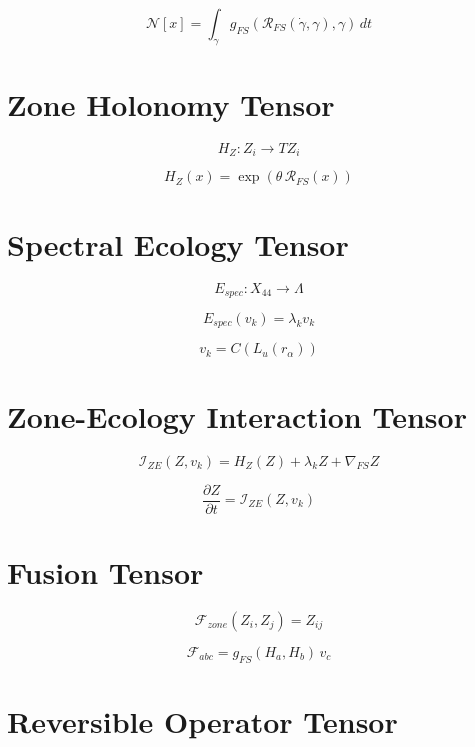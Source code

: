\[
\mathcal{N}[x]
= \int_{\gamma}
g_{FS}(\mathcal{R}_{FS}(\dot{\gamma},\gamma), \gamma)\, dt
\]


\section*{Zone Holonomy Tensor}

\[
H_Z : Z_i \to TZ_i
\]

\[
H_Z(x)
= \exp(\theta\, \mathcal{R}_{FS}(x))
\]


\section*{Spectral Ecology Tensor}

\[
E_{spec} : X_{44} \to \Lambda
\]

\[
E_{spec}(v_k)
= \lambda_k v_k
\]

\[
v_k = C(L_u(r_\alpha))
\]


\section*{Zone-Ecology Interaction Tensor}

\[
\mathcal{I}_{ZE}(Z, v_k)
= H_Z(Z)
+ \lambda_k Z
+ \nabla_{FS} Z
\]

\[
\frac{\partial Z}{\partial t}
= \mathcal{I}_{ZE}(Z, v_k)
\]


\section*{Fusion Tensor}

\[
\mathcal{F}_{zone}(Z_i, Z_j)
= Z_{ij}
\]

\[
\mathcal{F}_{abc}
= g_{FS}(H_a, H_b)\, v_c
\]


\section*{Reversible Operator Tensor}

